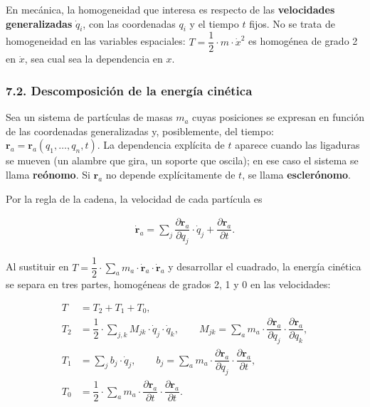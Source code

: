 \documentclass[
  spanish,
]{article}
\begin{document}
En mecánica, la homogeneidad que interesa es respecto de las
\textbf{velocidades generalizadas} \(\dot{q}_i\), con las coordenadas
\(q_i\) y el tiempo \(t\) fijos. No se trata de homogeneidad en las
variables espaciales: \(T = \dfrac{1}{2} \cdot m \cdot \dot{x}^2\) es
homogénea de grado 2 en \(\dot{x}\), sea cual sea la dependencia en
\(x\).

\subsubsection{7.2. Descomposición de la energía
cinética}\label{descomposiciuxf3n-de-la-energuxeda-cinuxe9tica}

Sea un sistema de partículas de masas \(m_a\) cuyas posiciones se
expresan en función de las coordenadas generalizadas y, posiblemente,
del tiempo: \(\mathbf{r}_a = \mathbf{r}_a(q_1, \dots, q_n, t)\). La
dependencia explícita de \(t\) aparece cuando las ligaduras se mueven
(un alambre que gira, un soporte que oscila); en ese caso el sistema se
llama \textbf{reónomo}. Si \(\mathbf{r}_a\) no depende explícitamente de
\(t\), se llama \textbf{esclerónomo}.

Por la regla de la cadena, la velocidad de cada partícula es

\[
\begin{aligned}
\dot{\mathbf{r}}_a = \sum_{j} \dfrac{\partial \mathbf{r}_a}{\partial q_j} \cdot \dot{q}_j + \dfrac{\partial \mathbf{r}_a}{\partial t}.
\end{aligned}
\]

Al sustituir en
\(T = \dfrac{1}{2} \cdot \sum_a m_a \cdot \dot{\mathbf{r}}_a \cdot \dot{\mathbf{r}}_a\)
y desarrollar el cuadrado, la energía cinética se separa en tres partes,
homogéneas de grados 2, 1 y 0 en las velocidades:

\[
\begin{aligned}
T &= T_2 + T_1 + T_0, \\
T_2 &= \dfrac{1}{2} \cdot \sum_{j,k} M_{jk} \cdot \dot{q}_j \cdot \dot{q}_k,
\qquad M_{jk} = \sum_a m_a \cdot \dfrac{\partial \mathbf{r}_a}{\partial q_j} \cdot \dfrac{\partial \mathbf{r}_a}{\partial q_k}, \\
T_1 &= \sum_{j} b_j \cdot \dot{q}_j,
\qquad b_j = \sum_a m_a \cdot \dfrac{\partial \mathbf{r}_a}{\partial q_j} \cdot \dfrac{\partial \mathbf{r}_a}{\partial t}, \\
T_0 &= \dfrac{1}{2} \cdot \sum_a m_a \cdot \dfrac{\partial \mathbf{r}_a}{\partial t} \cdot \dfrac{\partial \mathbf{r}_a}{\partial t}.
\end{aligned}
\]
\end{document}
